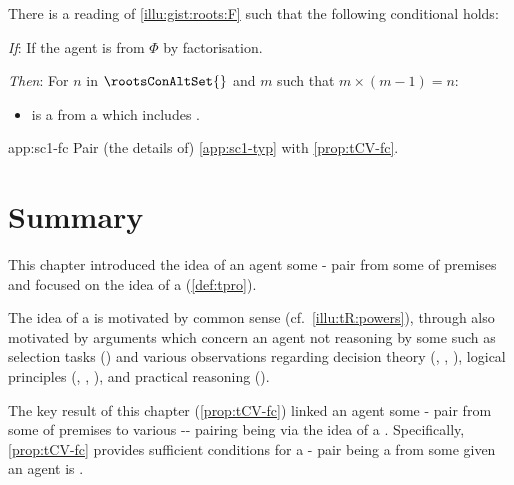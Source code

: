 \begin{note}
  \begin{application}%
    \label{app:sc1-fc}%
    There is a reading of \autoref{illu:gist:roots:F} such that the following conditional holds:
    \begin{itenum}
    \item[\emph{If}:]
      If the agent is \tCV{}  from \(\Phi\) by factorisation.
    \item[\emph{Then}:]
      For \(n\) in  \(\rootsConAltSet{}\) and \(m\) such that \(m \times (m - 1) = n\):
      \begin{itemize}
      \item
         is a \fc{} from a \pool{} which includes .
      \end{itemize}
    \end{itenum}
    \vspace{-\baselineskip}
  \end{application}

  \begin{dets}{app:sc1-fc}
    Pair (the details of) \autoref{app:sc1-typ} with \autoref{prop:tCV-fc}.
  \end{dets}
\end{note}


\section*{Summary}

\begin{note}
  This chapter introduced the idea of an agent \tCV{} some - pair from some \pool{} of premises and focused on the idea of a \tprof{} (\autoref{def:tpro}).

  The idea of a \tpro{} is motivated by common sense (cf.\ \autoref{illu:tR:powers}), through also motivated by arguments which concern an agent not reasoning by some \torN{} such as selection tasks (\cite{Wason:1966aa}) and various observations regarding decision theory (\cite{Allais:1979aa}, \cite{Ellsberg:1961aa}, \cite{Quinn:1990aa}), logical principles (\cite{Makinson:1965aa}, \cite{Kyburg:1997aa}, \cite{Harman:1984aa}), and practical reasoning (\cite{Bratman:1981aa,Bratman:1987aa}).
\end{note}


\begin{note}
  The key result of this chapter (\autoref{prop:tCV-fc}) linked an agent \tCV{} some - pair from some \pool{} of premises to various -- pairing being  via the idea of a \tpro{}.
  Specifically, \autoref{prop:tCV-fc} provides sufficient conditions for a - pair being a \fc{} from some \pool{} given an agent is \tCV{}.
\end{note}







